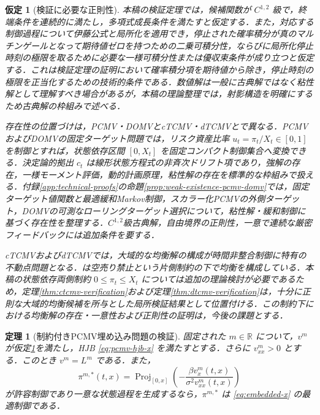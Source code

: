 \documentclass[10pt,a4paper]{article}
\theoremstyle{plain}
\newtheorem{theorem}{定理}
\newtheorem{assumption}{仮定}
\theoremstyle{definition}
\DeclareMathOperator{\Proj}{Proj}
\newcommand{\R}{\mathbb{R}}
\begin{document}
\begin{assumption}[検証に必要な正則性]
\label{ass:verification}
本稿の検証定理では，候補関数が $C^{1,2}$ 級で，終端条件を連続的に満たし，多項式成長条件を満たすと仮定する．また，対応する制御過程について伊藤公式と局所化を適用でき，停止された確率積分が真のマルチンゲールとなって期待値ゼロを持つための二乗可積分性，ならびに局所化停止時刻の極限を取るために必要な一様可積分性または優収束条件が成り立つと仮定する．これは検証定理の証明において確率積分項を期待値から除き，停止時刻の極限を正当化するための技術的条件である．数値解は一般に古典解ではなく粘性解として理解すべき場合があるが，本稿の理論整理では，射影構造を明確にするため古典解の枠組みで述べる．

存在性の位置づけは，PCMV・DOMVとcTCMV・dTCMVとで異なる．PCMVおよびDOMVの固定ターゲット問題では，リスク資産比率 $u_t=\pi_t/X_t\in[0,1]$ を制御とすれば，状態依存区間 $[0,X_t]$ を固定コンパクト制御集合へ変換できる．決定論的拠出 $c_t$ は線形状態方程式の非斉次ドリフト項であり，強解の存在，一様モーメント評価，動的計画原理，粘性解の存在を標準的な枠組みで扱える．付録\ref{app:technical-proofs}の命題\ref{prop:weak-existence-pcmv-domv}では，固定ターゲット値関数と最適緩和Markov制御，スカラー化PCMVの外側ターゲット，DOMVの可測なローリングターゲット選択について，粘性解・緩和制御に基づく存在性を整理する\citep{LiZhouLim2002,LiXu2016,FlemingSoner2006}．$C^{1,2}$級古典解，自由境界の正則性，一意で連続な厳密フィードバックには追加条件を要する．

cTCMVおよびdTCMVでは，大域的な均衡解の構成が時間非整合制御に特有の不動点問題となる．\citet{BensoussanWongYamYung2014}は空売り禁止という片側制約の下で均衡を構成している．本稿の状態依存両側制約 $0\leq\pi_t\leq X_t$ については追加の理論検討が必要であるため，定理\ref{thm:ctcmv-verification}および定理\ref{thm:dtcmv-verification}は，十分に正則な大域的均衡候補を所与とした局所検証結果として位置付ける．この制約下における均衡解の存在・一意性および正則性の証明は，今後の課題とする．
\end{assumption}

\begin{theorem}[制約付きPCMV埋め込み問題の検証]
\label{thm:embedded-pcmv}
固定された $m\in\R$ について，$v^m$ が仮定\ref{ass:verification}を満たし，HJB \eqref{eq:pcmv-hjb-x} を満たすとする．さらに $v_{xx}^m>0$ とする．このとき $v^m=L^m$ である．また，
\begin{equation}
  \pi^{m,*}(t,x)
  =
  \Proj_{[0,x]}
  \left(
  -\frac{\beta v_x^m(t,x)}{\sigma^2v_{xx}^m(t,x)}
  \right)
  \label{eq:pcmv-projection-x}
\end{equation}
が許容制御であり一意な状態過程を生成するなら，$\pi^{m,*}$ は \eqref{eq:embedded-x} の最適制御である．
\end{theorem}
\end{document}
